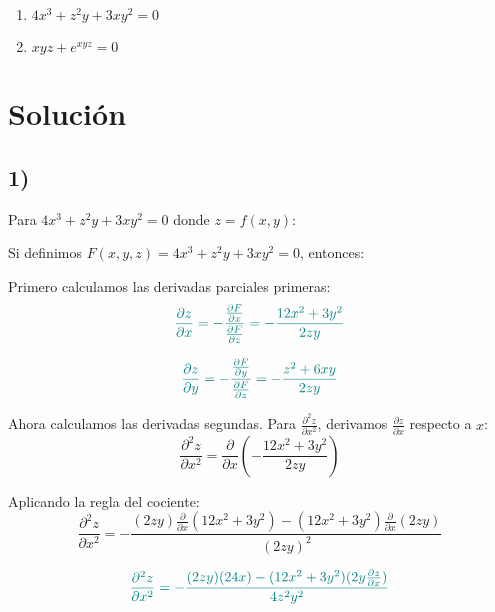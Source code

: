 \documentclass{article}
\begin{document}
\begin{enumerate}
  \item \(4x^3 + z^2 y + 3xy^2 = 0\)
  \item \(xyz + e^{xyz} = 0\)
\end{enumerate}



\newpage
\section*{Solución}
\subsection*{1)}

Para $4x^3 + z^2 y + 3xy^2 = 0$ donde $z = f(x,y)$:
  
  Si definimos $F(x,y,z) = 4x^3 + z^2 y + 3xy^2 = 0$, entonces:
  
  Primero calculamos las derivadas parciales primeras:
  \begin{equation} \color{teal}
  \frac{\partial z}{\partial x} = -\frac{\frac{\partial F}{\partial x}}{\frac{\partial F}{\partial z}} = -\frac{12x^2 + 3y^2}{2zy}
  \end{equation}
  
  \begin{equation}\color{teal}
  \frac{\partial z}{\partial y} = -\frac{\frac{\partial F}{\partial y}}{\frac{\partial F}{\partial z}} = -\frac{z^2 + 6xy}{2zy}
  \end{equation}
  
  Ahora calculamos las derivadas segundas. Para $\frac{\partial^2 z}{\partial x^2}$, derivamos $\frac{\partial z}{\partial x}$ respecto a $x$:
  \begin{equation}
  \frac{\partial^2 z}{\partial x^2} = \frac{\partial}{\partial x}\left(-\frac{12x^2 + 3y^2}{2zy}\right)
  \end{equation}
  
  Aplicando la regla del cociente:
  \begin{equation}
  \frac{\partial^2 z}{\partial x^2} = -\frac{(2zy)\frac{\partial}{\partial x}(12x^2 + 3y^2) - (12x^2 + 3y^2)\frac{\partial}{\partial x}(2zy)}{(2zy)^2}
  \end{equation}
  
  \begin{equation}\color{teal}
  \frac{\partial^2 z}{\partial x^2} = -\frac{(2zy)(24x) - (12x^2 + 3y^2)(2y\frac{\partial z}{\partial x})}{4z^2y^2}
  \end{equation}
  
\end{document}
